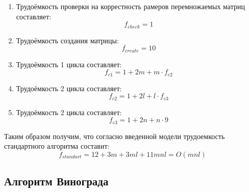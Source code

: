 \begin{enumerate}
	\item Трудоёмкость проверки на коррестность рамеров перемножаемых матриц составляет:
	\begin{equation}
	f_{check} = 1
	\end{equation}
	
	\item Трудоёмкость создания матрицы:
	\begin{equation}
	f_{create} = 10
	\end{equation}
	
	\item Трудоёмкость 1 цикла составляет:
	\begin{equation}
	\label{for:MV}
	f_{c1} = 1 + 2m + m \cdot f_{c2}
	\end{equation}

	\item Трудоёмкость 2 цикла составляет:
	\begin{equation}
	\label{for:MV}
	f_{c2} = 1 + 2l + l \cdot f_{c3}
	\end{equation}

	\item Трудоёмкость 2 цикла составляет:
	\begin{equation}
	\label{for:MV}
	f_{c3} = 1 + 2n + n \cdot 9
	\end{equation}
\end{enumerate}

Таким образом получим, что согласно введенной модели трудоемкость стандартного алгоритма составит:
$$
f_{standart} = 12 + 3m + 3ml + 11mnl = O(mnl)
$$

\subsection{Алгоритм Винограда}

